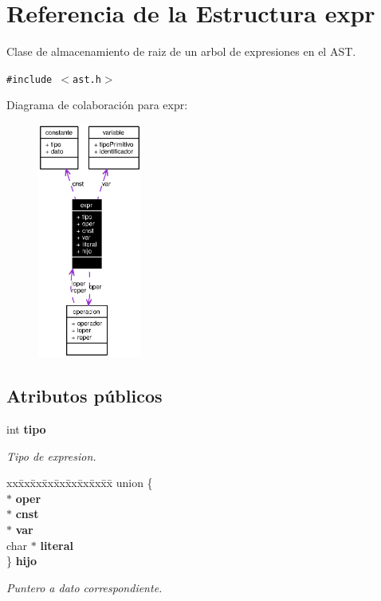 \section{Referencia de la Estructura expr}
\label{structexpr}
Clase de almacenamiento de raiz de un arbol de expresiones en el AST.  


{\tt \#include $<$ast.h$>$}

Diagrama de colaboraci\'{o}n para expr:\begin{figure}[H]
\begin{center}
\leavevmode
\includegraphics[width=97pt]{structexpr__coll__graph}
\end{center}
\end{figure}
\subsection*{Atributos p\'{u}blicos}
\begin{CompactItemize}
\item 
int {\bf tipo}
\begin{CompactList}\small\item\em Tipo de expresion. \item\end{CompactList}\item 
\begin{tabbing}
xx\=xx\=xx\=xx\=xx\=xx\=xx\=xx\=xx\=\kill
union \{\\
 $\ast$ {\bf oper}\\
 $\ast$ {\bf cnst}\\
 $\ast$ {\bf var}\\
\>char $\ast$ {\bf literal}\\
\} {\bf hijo}\\

\end{tabbing}\begin{CompactList}\small\item\em Puntero a dato correspondiente. \item\end{CompactList}\end{CompactItemize}


